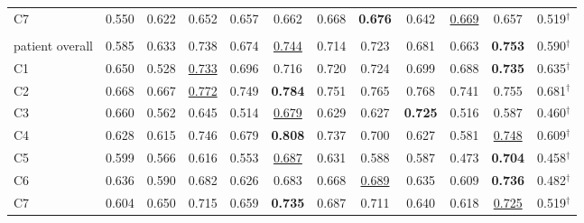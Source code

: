 \begin{minipage}{\textwidth}
{\begin{tabular}{@{}lccccccccccc@{}}
C7 & 0.550 & 0.622 & 0.652 & 0.657 & 0.662 & 0.668 & \textbf{0.676} & 0.642 & \underline{0.669} & 0.657 & 0.519$^{\dagger}$ \\
\addlinespace
\multicolumn{12}{@{}l}{\textit{joint}} \\
patient overall & 0.585 & 0.633 & 0.738 & 0.674 & \underline{0.744} & 0.714 & 0.723 & 0.681 & 0.663 & \textbf{0.753} & 0.590$^{\dagger}$ \\
C1 & 0.650 & 0.528 & \underline{0.733} & 0.696 & 0.716 & 0.720 & 0.724 & 0.699 & 0.688 & \textbf{0.735} & 0.635$^{\dagger}$ \\
C2 & 0.668 & 0.667 & \underline{0.772} & 0.749 & \textbf{0.784} & 0.751 & 0.765 & 0.768 & 0.741 & 0.755 & 0.681$^{\dagger}$ \\
C3 & 0.660 & 0.562 & 0.645 & 0.514 & \underline{0.679} & 0.629 & 0.627 & \textbf{0.725} & 0.516 & 0.587 & 0.460$^{\dagger}$ \\
C4 & 0.628 & 0.615 & 0.746 & 0.679 & \textbf{0.808} & 0.737 & 0.700 & 0.627 & 0.581 & \underline{0.748} & 0.609$^{\dagger}$ \\
C5 & 0.599 & 0.566 & 0.616 & 0.553 & \underline{0.687} & 0.631 & 0.588 & 0.587 & 0.473 & \textbf{0.704} & 0.458$^{\dagger}$ \\
C6 & 0.636 & 0.590 & 0.682 & 0.626 & 0.683 & 0.668 & \underline{0.689} & 0.635 & 0.609 & \textbf{0.736} & 0.482$^{\dagger}$ \\
C7 & 0.604 & 0.650 & 0.715 & 0.659 & \textbf{0.735} & 0.687 & 0.711 & 0.640 & 0.618 & \underline{0.725} & 0.519$^{\dagger}$ \\
\bottomrule
\end{tabular}
}\end{minipage}
\par\bigskip
